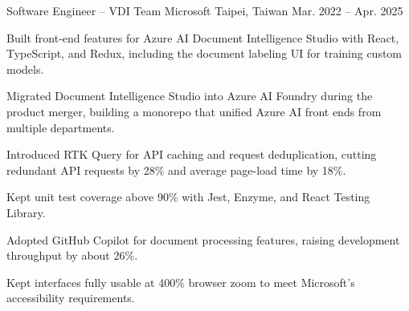 \resumeExperience
  {Software Engineer -- VDI Team}
  {Microsoft}
  {Taipei, Taiwan}
  {Mar. 2022 -- Apr. 2025}
  {
    \item Built front-end features for Azure AI Document Intelligence Studio with React, TypeScript, and Redux, including the document labeling UI for training custom models.
    \item Migrated Document Intelligence Studio into Azure AI Foundry during the product merger, building a monorepo that unified Azure AI front ends from multiple departments.
    \item Introduced RTK Query for API caching and request deduplication, cutting redundant API requests by 28\% and average page-load time by 18\%.
    \item Kept unit test coverage above 90\% with Jest, Enzyme, and React Testing Library.
    \item Adopted GitHub Copilot for document processing features, raising development throughput by about 26\%.
    \item Kept interfaces fully usable at 400\% browser zoom to meet Microsoft's accessibility requirements.
  }
